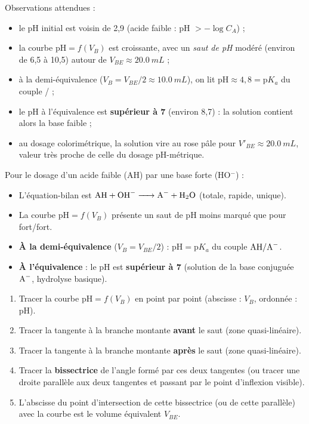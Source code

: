 \documentclass[11pt]{article}
\begin{document}
Observations attendues :

\begin{itemize}
\item le pH initial est voisin de 2,9 (acide faible : pH $> -\log C_A$) ;
\item la courbe $\mathrm{pH} = f(V_B)$ est croissante, avec un \emph{saut de pH} modéré (environ de 6,5 à 10,5) autour de $V_{BE} \approx \SI{20,0}{mL}$ ;
\item à la demi-équivalence ($V_B = V_{BE}/2 \approx \SI{10,0}{mL}$), on lit $\mathrm{pH} \approx 4{,}8 = \mathrm{p}K_a$ du couple / ;
\item le pH à l'équivalence est \textbf{supérieur à 7} (environ 8,7) : la solution contient alors la base faible  ;
\item au dosage colorimétrique, la solution vire au rose pâle pour $V'_{BE} \approx \SI{20,0}{mL}$, valeur très proche de celle du dosage pH-métrique.
\end{itemize}

\begin{propriete}
Pour le dosage d'un acide faible (AH) par une base forte (HO$^-$) :
\begin{itemize}
\item L'équation-bilan est $\ce{AH + OH- -> A- + H2O}$ (totale, rapide, unique).
\item La courbe $\mathrm{pH} = f(V_B)$ présente un saut de pH moins marqué que pour fort/fort.
\item \textbf{À la demi-équivalence} ($V_B = V_{BE}/2$) : $\mathrm{pH} = \mathrm{p}K_a$ du couple $\ce{AH}/\ce{A-}$.
\item \textbf{À l'équivalence} : le pH est \textbf{supérieur à 7} (solution de la base conjuguée $\ce{A-}$, hydrolyse basique).
\end{itemize}
\end{propriete}

\begin{methode}
\begin{enumerate}
\item Tracer la courbe $\mathrm{pH} = f(V_B)$ en point par point (abscisse : $V_B$, ordonnée : pH).
\item Tracer la tangente à la branche montante \textbf{avant} le saut (zone quasi-linéaire).
\item Tracer la tangente à la branche montante \textbf{après} le saut (zone quasi-linéaire).
\item Tracer la \textbf{bissectrice} de l'angle formé par ces deux tangentes (ou tracer une droite parallèle aux deux tangentes et passant par le point d'inflexion visible).
\item L'abscisse du point d'intersection de cette bissectrice (ou de cette parallèle) avec la courbe est le volume équivalent $V_{BE}$.
\end{enumerate}
\end{methode}
\end{document}
